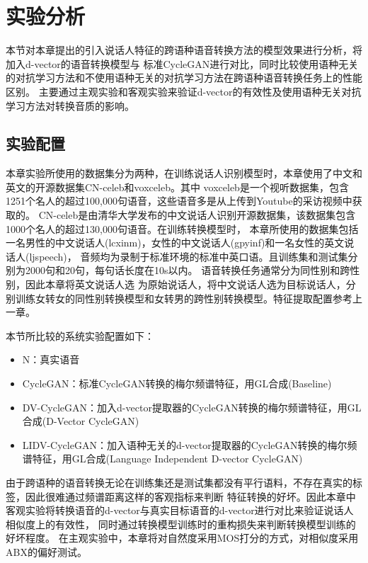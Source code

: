 \section{实验分析}
本节对本章提出的引入说话人特征的跨语种语音转换方法的模型效果进行分析，将加入d-vector的语音转换模型与
标准CycleGAN进行对比，同时比较使用语种无关的对抗学习方法和不使用语种无关的对抗学习方法在跨语种语音转换任务上的性能区别。
主要通过主观实验和客观实验来验证d-vector的有效性及使用语种无关对抗学习方法对转换音质的影响。
\subsection{实验配置}
本章实验所使用的数据集分为两种，在训练说话人识别模型时，本章使用了中文和英文的开源数据集CN-celeb和voxceleb。其中
voxceleb是一个视听数据集，包含1251个名人的超过100,000句语音，这些语音多是从上传到Youtube的采访视频中获取的。
CN-celeb是由清华大学发布的中文说话人识别开源数据集，该数据集包含1000个名人的超过130,000句语音。在训练转换模型时，
本章所使用的数据集包括一名男性的中文说话人(lcxinm)，女性的中文说话人(gpyinf)和一名女性的英文说话人(ljspeech)，
音频均为录制于标准环境的标准中英口语。且训练集和测试集分别为2000句和20句，每句话长度在10s以内。
语音转换任务通常分为同性别和跨性别，因此本章将英文说话人选
为原始说话人，将中文说话人选为目标说话人，分别训练女转女的同性别转换模型和女转男的跨性别转换模型。特征提取配置参考上一章。

本节所比较的系统实验配置如下：
\begin{itemize}
    \item N：真实语音
    \item CycleGAN：标准CycleGAN转换的梅尔频谱特征，用GL合成(Baseline)
    \item DV-CycleGAN：加入d-vector提取器的CycleGAN转换的梅尔频谱特征，用GL合成(D-Vector CycleGAN)
    \item LIDV-CycleGAN：加入语种无关的d-vector提取器的CycleGAN转换的梅尔频谱特征，用GL合成(Language Independent D-vector CycleGAN)
\end{itemize}

由于跨语种的语音转换无论在训练集还是测试集都没有平行语料，不存在真实的标签，因此很难通过频谱距离这样的客观指标来判断
特征转换的好坏。因此本章中客观实验将转换语音的d-vector与真实目标语音的d-vector进行对比来验证说话人相似度上的有效性，
同时通过转换模型训练时的重构损失来判断转换模型训练的好坏程度。
在主观实验中，本章将对自然度采用MOS打分的方式，对相似度采用ABX的偏好测试。

